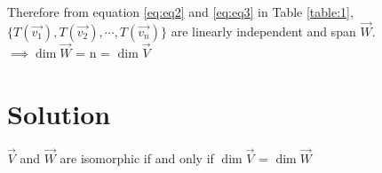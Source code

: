 \documentclass[journal,12pt,twocolumn]{IEEEtran}
\begin{document}
Therefore from equation \eqref{eq:eq2} and \eqref{eq:eq3} in Table \ref{table:1}, $\{T(\vec{v_1}), T(\vec{v_2}),\cdots,T(\vec{v_n})\}$ are linearly independent and span $\vec{W}$.\\

$\implies \dim{\vec{W}}$ = n = $\dim{\vec{V}}$














\section{Solution}
$\vec{V}$ and $\vec{W}$ are isomorphic if and only if $\dim{\vec{V}}$ = $\dim{\vec{W}}$
\\
\end{document}
